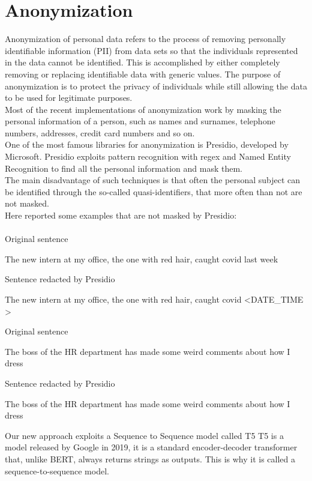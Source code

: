 \clearpage
\section{Anonymization}

Anonymization of personal data refers to the process of removing personally identifiable information (PII) from data sets so that the individuals represented in the data cannot be identified. This is accomplished by either completely removing or replacing identifiable data with generic values. The purpose of anonymization is to protect the privacy of individuals while still allowing the data to be used for legitimate purposes. \\
Most of the recent implementations of anonymization work by masking the personal information of a person, such as names and surnames, telephone numbers, addresses, credit card numbers and so on. \\
One of the most famous libraries for anonymization is Presidio, developed by Microsoft. Presidio exploits pattern recognition with regex and Named Entity Recognition to find all the personal information and mask them. \\
The main disadvantage of such techniques is that often the personal subject can be identified through the so-called quasi-identifiers, that more often than not are not masked.
\\Here reported some examples that are not masked by Presidio:\\ \\
Original sentence
\begin{adjustwidth}{1cm}{}
    The new intern at my office, the one with red hair, caught covid last week 
\end{adjustwidth}
Sentence redacted by Presidio
\begin{adjustwidth}{1cm}{}
    The new intern at my office, the one with red hair, caught covid \textless DATE\_TIME \textgreater
\end{adjustwidth}
Original sentence
\begin{adjustwidth}{1cm}{}
    The boss of the HR department has made some weird comments about how I dress
\end{adjustwidth}
Sentence redacted by Presidio
\begin{adjustwidth}{1cm}{}
    The boss of the HR department has made some weird comments about how I dress 
\end{adjustwidth}
Our new approach exploits a Sequence to Sequence model called T5
T5 is a model released by Google in 2019, it is a standard encoder-decoder transformer that, unlike BERT, always returns strings as outputs. This is why it is called a sequence-to-sequence model. \\
